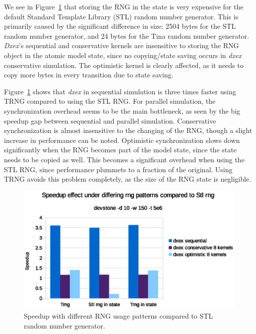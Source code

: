 We see in Figure~\ref{fig:Queuerngspeedup} that storing the RNG in the state is very expensive for the default Standard Template Library (STL) random number generator.
This is primarily caused by the significant difference in size: 2504 bytes for the STL random number generator, and 24 bytes for the Tina random number generator.
\textit{Dxex}'s sequential and conservative kernels are insensitive to storing the RNG object in the atomic model state, since no copying/state saving occurs in \textit{dxex} conservative simulation.
The optimistic kernel is clearly affected, as it needs to copy more bytes in every transition due to state saving.

Figure~\ref{fig:Queuerngspeedup} shows that \textit{dxex} in sequential simulation is three times faster using TRNG compared to using the STL RNG.
For parallel simulation, the synchronization overhead seems to be the main bottleneck, as seen by the big speedup gap between sequential and parallel simulation.
Conservative synchronization is almost insensitive to the changing of the RNG, though a slight increase in performance can be noted.
Optimistic synchronization slows down significantly when the RNG becomes part of the model state, since the state needs to be copied as well.
This becomes a significant overhead when using the STL RNG, since performance plummets to a fraction of the original.
Using TRNG avoids this problem completely, as the size of the RNG state is negligible.

\begin{figure}
    \center
    \includegraphics[width=\columnwidth]{fig/rngspeedupeffectdevstone.eps}
    \caption{Speedup with different RNG usage patterns compared to STL random number generator.}
    \label{fig:Queuerngspeedup}
\end{figure}
